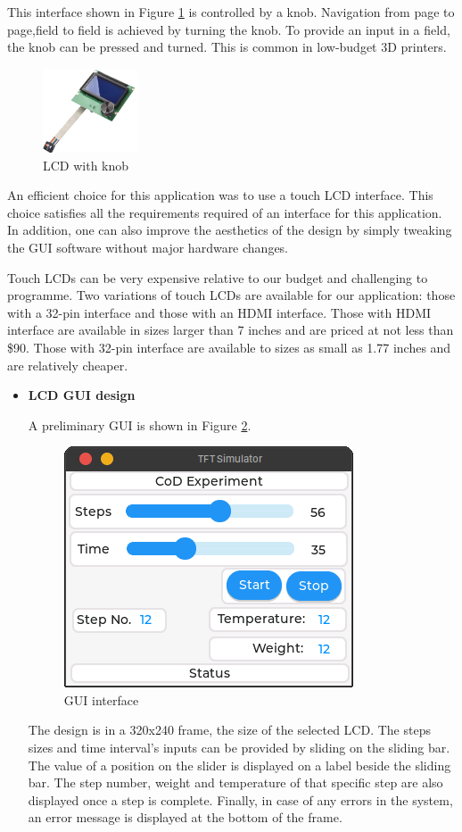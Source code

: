 \begin{enumerate}
    \par
    This interface shown in Figure \ref{fig:lcd_with_knobs} is controlled by a knob. Navigation from page to page,field to field is achieved by turning the knob. To provide an input in a field, the knob can be pressed and turned. This is common in low-budget 3D printers.
    \begin{figure}[H]
        \centering
        \includegraphics[width=0.25\textwidth,height=.25\textheight]{Figures/lcdwithknob.png}
        \caption[Lcd with knob]{LCD with knob \cite{noauthor_prusa_nodate}}
        \label{fig:lcd_with_knobs}
    \end{figure}
\end{enumerate}

 An efficient choice for this application was to use a touch LCD interface. This choice satisfies all the requirements required of an interface for this application. In addition, one can also improve the aesthetics of the design by simply tweaking the GUI software without major hardware changes.
 \par
 Touch LCDs can be very expensive relative to our budget and challenging to programme. Two variations of touch LCDs are available for our application: those with a 32-pin interface and those with an HDMI interface. Those with HDMI interface are available in sizes larger than 7 inches and are priced at not less than \$90. Those with 32-pin interface are available to sizes as small as 1.77 inches and are relatively cheaper.    
\begin{itemize}
    \item \textbf{LCD GUI design}
    \par
    A preliminary GUI is shown in Figure \ref{fig:GUI_interface}.
    \begin{figure}[H]
        \centering
        \includegraphics[width=.32\textwidth, height=.24\textheight]{Figures/interfacedesign.png}
        \caption{GUI interface}
        \label{fig:GUI_interface}
    \end{figure}
    The design is in a 320x240 frame, the size of the selected LCD. The steps sizes and time interval's inputs can be provided by sliding on the sliding bar. The value of a position on the slider is displayed on a label beside the sliding bar. The step number, weight and temperature of that specific step are also displayed once a step is complete.
    Finally, in case of any errors in the system, an error message is displayed at the bottom of the frame.
\end{itemize}

